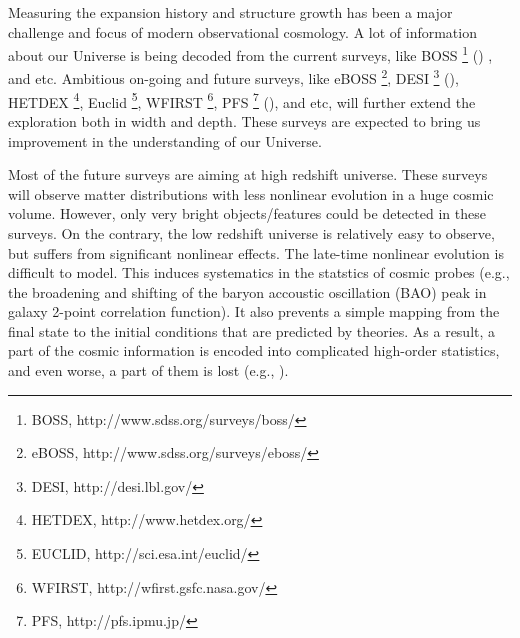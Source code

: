 \documentclass[iop]{emulateapj}
\begin{document}
Measuring the expansion history and structure growth has been a major challenge and focus of modern observational cosmology.
A lot of information about our Universe is being decoded from the current surveys, like BOSS \footnote{BOSS, http://www.sdss.org/surveys/boss/} (\cite{BOSS})
, and etc.
Ambitious on-going and future surveys, like eBOSS \footnote{eBOSS, http://www.sdss.org/surveys/eboss/}, DESI \footnote{DESI, http://desi.lbl.gov/} (\cite{DESIsci}), HETDEX \footnote{HETDEX, http://www.hetdex.org/}, Euclid \footnote{EUCLID, http://sci.esa.int/euclid/}, WFIRST \footnote{WFIRST, http://wfirst.gsfc.nasa.gov/}, PFS \footnote{PFS, http://pfs.ipmu.jp/} (\cite{PFScosmology}), and etc, will further extend the exploration both in width and depth.
These surveys are expected to bring us improvement in the understanding of our Universe.

Most of the future surveys are aiming at high redshift universe.
These surveys will observe matter distributions with less nonlinear evolution in a huge cosmic volume.
However, only very bright objects/features could be detected in these surveys.
On the contrary, the low redshift universe is relatively easy to observe, but suffers from significant nonlinear effects.
The late-time nonlinear evolution is difficult to model.
This induces systematics in the statstics of cosmic probes (e.g., the broadening and shifting of the baryon accoustic oscillation (BAO) peak in galaxy 2-point correlation function).
It also prevents a simple mapping from the final state to the initial conditions that are predicted by theories.
As a result, a part of the cosmic information is encoded into complicated high-order statistics, and even worse, a part of them is lost (e.g., \cite{Rimes05,Rimes06,Neyrinck06,Carron12a}).
\end{document}
